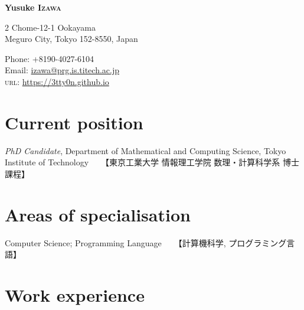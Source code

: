 \documentclass[11pt]{article} %
\newcommand{\伊澤侑祐}{\underline{伊澤侑祐}}
\begin{document}

{\LARGE\sffamily\bfseries\color{CadetBlue4} Yusuke \textsc{Izawa}} %
\bigskip\bigskip %

2 Chome-12-1 Ookayama\\
Meguro City, Tokyo 152-8550, Japan\\ %

\medskip

Phone: +8190-4027-6104\\ %
Email: \href{mailto:izawa@prg.is.titech.ac.jp}{izawa@prg.is.titech.ac.jp}\\ %
\textsc{url}: \href{https://3tty0n.github.io}{https://3tty0n.github.io} \\ %


\section*{Current position}

\emph{PhD Candidate}, Department of Mathematical and Computing Science,
Tokyo Institute of Technology~~~【東京工業大学 情報理工学院 数理・計算科学系 博士課程】



\section*{Areas of specialisation}

Computer Science; Programming Language~~~【計算機科学, プログラミング言語】


\section*{Work experience}

\end{document}
